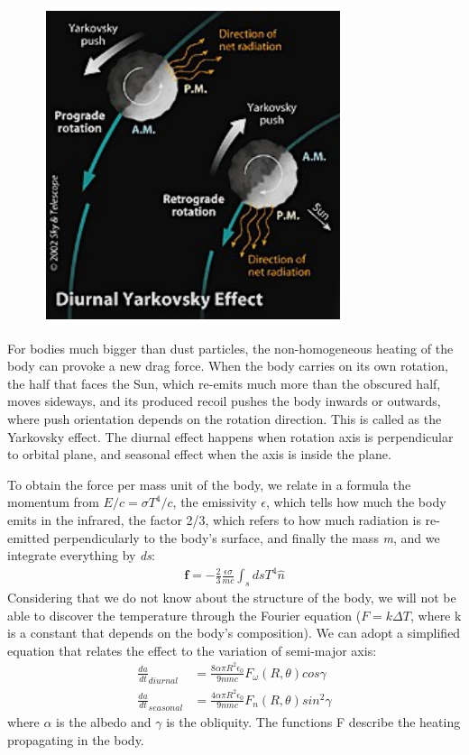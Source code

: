 \documentclass[12pt,a4paper]{article}
\begin{document}
\begin{figure}
\includegraphics[scale=0.85]{4}
\end{figure}

For bodies much bigger than dust particles, the non-homogeneous heating of the body can provoke a new drag force. When the body carries on its own rotation, the half that faces the Sun, which re-emits much more than the obscured half, moves sideways, and its produced recoil pushes the body inwards or outwards, where push orientation depends on the rotation direction. This is called as the Yarkovsky effect. The diurnal effect happens when rotation axis is perpendicular to orbital plane, and seasonal effect when the axis is inside the plane.

To obtain the force per mass unit of the body, we relate in a formula the momentum from $E/c=\sigma T^4/c$, the emissivity $\epsilon$, which tells how much the body emits in the infrared, the factor 2/3, which refers to how much radiation is re-emitted perpendicularly to the body's surface, and finally the mass \textit{m}, and we integrate everything by \textit{ds}:
\begin{align}
    \textbf{f}=-\frac{2}{3}\frac{\epsilon\sigma}{mc}\int_sdsT^4\hat{n}
\end{align}
Considering that we do not know about the structure of the body, we will not be able to discover the temperature through the Fourier equation ($F=k\Delta T$, where k is a constant that depends on the body's composition). We can adopt a simplified equation that relates the effect to the variation of semi-major axis:
\begin{align}
    \frac{da}{dt}_{diurnal}&=\frac{8\alpha\pi R^2\epsilon_0}{9nmc}F_\omega(R,\theta)cos\gamma \\
    \frac{da}{dt}_{seasonal}&=\frac{4\alpha\pi R^2\epsilon_0}{9nmc}F_n(R,\theta)sin^2\gamma
\end{align}
where $\alpha$ is the albedo and $\gamma$ is the obliquity. The functions F describe the heating propagating in the body.
\end{document}

